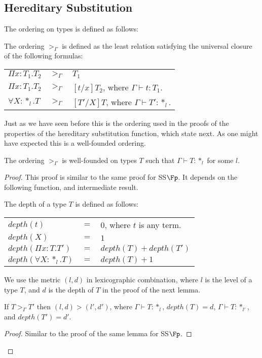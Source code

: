 
\subsection{Hereditary Substitution}
\label{sec:the_hereditary_substitution_function_ssfe}
The ordering on types is defined as follows:
\begin{definition}
  The ordering $>_\Gamma$ is defined as the least relation satisfying the universal closure
  of the following formulas:
  \begin{center}
    \begin{tabular}{lll}
      $\Pi x:T_1.T_2$ & $>_\Gamma$ & $T_1$\\
      $\Pi x:T_1.T_2$ & $>_{\Gamma}$ & $[t/x]T_2$, where $\Gamma \vdash t:T_1$.\\
      $\forall X:*_l.T$  & $>_\Gamma$ & $[T'/X]T$, where $\Gamma \vdash T':*_l$.\\
    \end{tabular}
  \end{center}
  \label{def:ordering_ssfe}
\end{definition}
Just as we have seen before this is the ordering used in the proofs of
the properties of the hereditary substitution function, which state
next.  As one might have expected this is a well-founded ordering.
\begin{thm}
  The ordering $>_\Gamma$ is well-founded on types $T$ such that 
  $\Gamma \vdash T:*_l$ for some $l$.
  \label{thm:well-founded_ordering_ssfe}
\end{thm}
\begin{proof}
  This proof is similar to the same proof for SS$\Fp$.  It depends on
  the following function, and intermediate result.
  \begin{definition}
  The depth of a type $T$ is defined as follows:
  \begin{center}
    \begin{tabular}{lll}
      $depth(t)$                  & $=$ & $0$, where $t$ is any term.\\
      $depth(X)$                  & $=$ & $1$\\
      $depth(\Pi x:T.T')$   & $=$ & $depth(T) + depth(T')$\\
      $depth(\forall X:*_l.T)$ & $=$ & $depth(T) + 1$\\
    \end{tabular}
  \end{center}
\end{definition}
\noindent
We use the metric $(l,d)$ in lexicographic combination, where $l$ is the level of
a type $T$, and $d$ is the depth of $T$ in the proof of the next lemma.  

\begin{lemma}
  \label{lemma:well-founded_measure_ssfe}
  If $T >_\Gamma T'$ then $(l,d) > (l',d')$, where $\Gamma \vdash T:*_l$, 
  $depth(T) = d$,  $\Gamma \vdash T:*_{l'}$, and $depth(T') = d'$.
\end{lemma}
\begin{proof}
  Similar to the proof of the same lemma for SS$\Fp$. 
\end{proof}
\end{proof}
